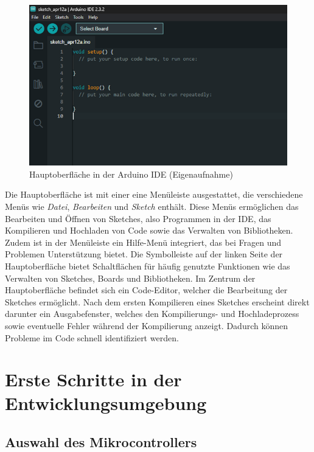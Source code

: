 \begin{figure}[H]
	\begin{center}
		\includegraphics[width=\textwidth]{Images/IDE/HauptoberflaecheIDE.png} 
		\caption{Hauptoberfläche in der Arduino IDE (Eigenaufnahme)} \label{HauptoeberflIDE}
	\end{center}
\end{figure}

Die Hauptoberfläche ist mit einer eine Menüleiste ausgestattet, die verschiedene Menüs wie \textit{Datei}, \textit{Bearbeiten} und \textit{Sketch} enthält. Diese Menüs ermöglichen das Bearbeiten und Öffnen von Sketches, also Programmen in der IDE, das Kompilieren und Hochladen von Code sowie das Verwalten von Bibliotheken. Zudem ist in der Menüleiste ein Hilfe-Menü integriert, das bei Fragen und Problemen Unterstützung bietet. 
Die Symbolleiste auf der linken Seite der Hauptoberfläche bietet Schaltflächen für häufig genutzte Funktionen wie das Verwalten von Sketches, Boards und Bibliotheken.
Im Zentrum der Hauptoberfläche befindet sich ein Code-Editor, welcher die Bearbeitung der Sketches ermöglicht. Nach dem ersten Kompilieren eines Sketches erscheint direkt darunter ein Ausgabefenster, welches den Kompilierungs- und Hochladeprozess sowie eventuelle Fehler während der Kompilierung anzeigt. Dadurch können Probleme im Code schnell identifiziert werden.

\section{Erste Schritte in der Entwicklungsumgebung}

\subsection{Auswahl des Mikrocontrollers}

